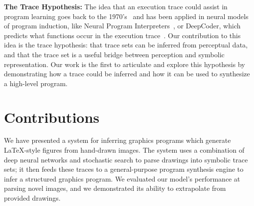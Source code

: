 \documentclass{article}
\theoremstyle{definition}
\begin{document}
\textbf{The Trace Hypothesis:} The idea that an execution trace could assist in program learning goes back to the 1970's~\citep{Summers:1977:MLP:321992.322002} and has  been applied in neural models of program induction, like Neural Program Interpreters~\citep{DBLP:journals/corr/ReedF15}, or DeepCoder, which predicts what functions occur in the execution trace~\citep{BalGauBroetal16}.
Our contribution to this idea is the trace hypothesis:
that  trace sets can be inferred from perceptual data,
and that the trace set is a useful bridge between perception and symbolic representation.
Our work is the first to articulate and explore this hypothesis
by demonstrating how a trace could be inferred and how it can be used to synthesize a high-level program.




\section{Contributions}

We have presented a system for inferring graphics programs which generate \LaTeX-style figures from hand-drawn images. The system uses a combination of deep neural networks and stochastic search to parse drawings into symbolic trace sets; it then feeds these traces to a general-purpose program synthesis engine to infer a structured graphics program. We evaluated our model's performance at parsing novel images, and we demonstrated its ability to extrapolate from provided drawings.
\end{document}
